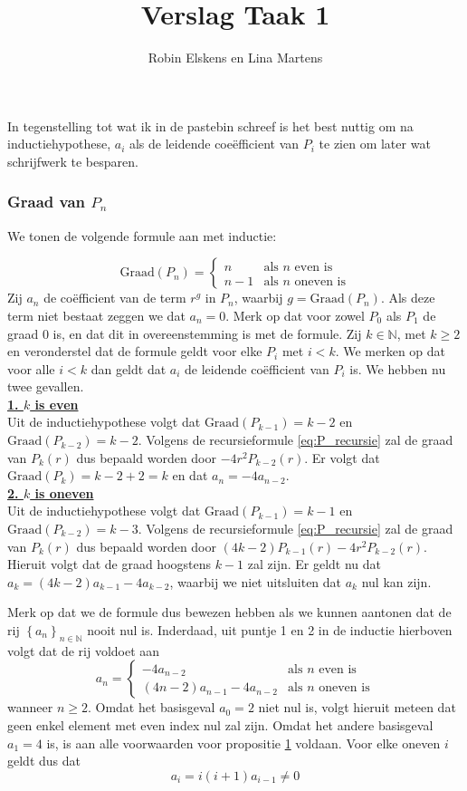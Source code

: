 \documentclass[12pt,a4paper]{article}
\title{Verslag Taak 1}
\author{Robin Elskens en Lina Martens}
\date{} %
\theoremstyle{definition}
\numberwithin{equation}{section}
\begin{document}
\maketitle

In tegenstelling tot wat ik in de pastebin schreef is het best nuttig om na inductiehypothese, $a_i$ als de leidende coeëfficient van $P_i$ te zien om later wat schrijfwerk te besparen.
\subsubsection*{Graad van $P_n$}
We tonen de volgende formule aan met inductie: 

\begin{equation*}
\text{Graad$(P_n)=$}
\begin{cases}
n & \text{als $n$ even is}\\
n-1 & \text{als $n$ oneven is}
\end{cases}
\end{equation*}
Zij $a_n$ de coëfficient van de term $r^g$ in $P_n$, waarbij $g=\text{Graad}(P_n)$. Als deze term niet bestaat zeggen we dat $a_n = 0$.
Merk op dat voor zowel $P_0$ als $P_1$ de graad 0 is, en dat dit in overeenstemming is met de formule.
Zij $k\in\mathbb{N}$, met $k\geq2$ en veronderstel dat de formule geldt voor elke $P_i$ met $i<k$. 
We merken op dat voor alle $i<k$ dan geldt dat $a_i$ de leidende coëfficient van $P_i$ is.
We hebben nu twee gevallen.\\
%
\underline{\textbf{1. $k$ is even}}\\
Uit de inductiehypothese volgt dat $\text{Graad}(P_{k-1}) = k-2$ en $\text{Graad}(P_{k-2}) = k-2$.
Volgens de recursieformule \eqref{eq:P_recursie} zal de graad van $P_k(r)$ dus bepaald worden door $-4r^2P_{k-2}(r)$. Er volgt dat $\text{Graad}(P_k) = k-2+2 = k$ en dat $a_n=-4a_{n-2}.$
\\
\underline{\textbf{2. $k$ is oneven}}\\
Uit de inductiehypothese volgt dat $\text{Graad}(P_{k-1}) = k-1$ en $\text{Graad}(P_{k-2}) = k-3$.
Volgens de recursieformule \eqref{eq:P_recursie} zal de graad van $P_k(r)$ dus bepaald worden door $(4k-2)P_{k-1}(r)-4r^2P_{k-2}(r)$.
Hieruit volgt dat de graad hoogstens $k-1$ zal zijn. Er geldt nu dat $a_{k} = (4k-2)a_{k-1} -4a_{k-2}$, waarbij we niet uitsluiten dat $a_k$ nul kan zijn.


\vspace{5mm}
Merk op dat we de formule dus bewezen hebben als we kunnen aantonen dat de rij $\left\{a_n\right\}_{n\in\mathbb{N}}$ nooit nul is. 
Inderdaad, uit puntje 1 en 2 in de inductie hierboven volgt dat de rij voldoet aan
$$a_n=
\begin{cases}
  -4 a_{n-2} & \text{als $n$ even is}\\
  \left(4n-2\right)a_{n-1} - 4a_{n-2} & \text{als $n$ oneven is}
\end{cases}$$
wanneer $n\geq2$.
Omdat het basisgeval $a_0 = 2$ niet nul is, volgt hieruit meteen dat geen enkel element met even index nul zal zijn.
Omdat het andere basisgeval $a_1 = 4$ is, is aan alle voorwaarden voor propositie \hyperref[thm:prop1]{1} voldaan.
Voor elke oneven $i$ geldt dus dat $$a_i = i(i+1)a_{i-1} \neq 0$$
\end{document}
